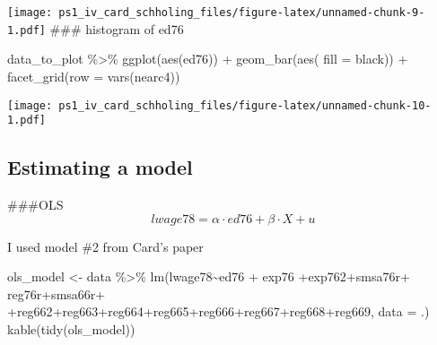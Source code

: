 \documentclass[
]{article}
\newenvironment{Shaded}{\begin{snugshade}}{\end{snugshade}}
\newcommand{\AttributeTok}[1]{\textcolor[rgb]{0.77,0.63,0.00}{#1}}
\newcommand{\FunctionTok}[1]{\textcolor[rgb]{0.00,0.00,0.00}{#1}}
\newcommand{\NormalTok}[1]{#1}
\newcommand{\OtherTok}[1]{\textcolor[rgb]{0.56,0.35,0.01}{#1}}
\newcommand{\SpecialCharTok}[1]{\textcolor[rgb]{0.00,0.00,0.00}{#1}}
\begin{document}
\texttt{[image: ps1\_iv\_card\_schholing\_files/figure-latex/unnamed-chunk-9-1.pdf]}
\#\#\# histogram of ed76

\begin{Shaded}
\begin{Highlighting}[]
\NormalTok{data\_to\_plot }\SpecialCharTok{\%\textgreater{}\%} \FunctionTok{ggplot}\NormalTok{(}\FunctionTok{aes}\NormalTok{(ed76)) }\SpecialCharTok{+} 
  \FunctionTok{geom\_bar}\NormalTok{(}\FunctionTok{aes}\NormalTok{(}
    \AttributeTok{fill =}\NormalTok{ black)) }\SpecialCharTok{+} 
  \FunctionTok{facet\_grid}\NormalTok{(}\AttributeTok{row =} \FunctionTok{vars}\NormalTok{(nearc4))}
\end{Highlighting}
\end{Shaded}

\texttt{[image: ps1\_iv\_card\_schholing\_files/figure-latex/unnamed-chunk-10-1.pdf]}

\hypertarget{estimating-a-model}{%
\subsection{Estimating a model}\label{estimating-a-model}}

\#\#\#OLS \[ lwage78 = \alpha \cdot ed76 + \beta \cdot X  + u\]

I used model \#2 from Card's paper

\begin{Shaded}
\begin{Highlighting}[]
\NormalTok{ols\_model }\OtherTok{\textless{}{-}}\NormalTok{ data }\SpecialCharTok{\%\textgreater{}\%} \FunctionTok{lm}\NormalTok{(lwage78}\SpecialCharTok{\textasciitilde{}}\NormalTok{ed76 }\SpecialCharTok{+}\NormalTok{ exp76 }\SpecialCharTok{+}\NormalTok{exp762}\SpecialCharTok{+}\NormalTok{smsa76r}\SpecialCharTok{+}\NormalTok{ reg76r}\SpecialCharTok{+}\NormalTok{smsa66r}\SpecialCharTok{+}              
\SpecialCharTok{+}\NormalTok{reg662}\SpecialCharTok{+}\NormalTok{reg663}\SpecialCharTok{+}\NormalTok{reg664}\SpecialCharTok{+}\NormalTok{reg665}\SpecialCharTok{+}\NormalTok{reg666}\SpecialCharTok{+}\NormalTok{reg667}\SpecialCharTok{+}\NormalTok{reg668}\SpecialCharTok{+}\NormalTok{reg669, }\AttributeTok{data =}\NormalTok{ .)}
\FunctionTok{kable}\NormalTok{(}\FunctionTok{tidy}\NormalTok{(ols\_model))}
\end{Highlighting}
\end{Shaded}
\end{document}
